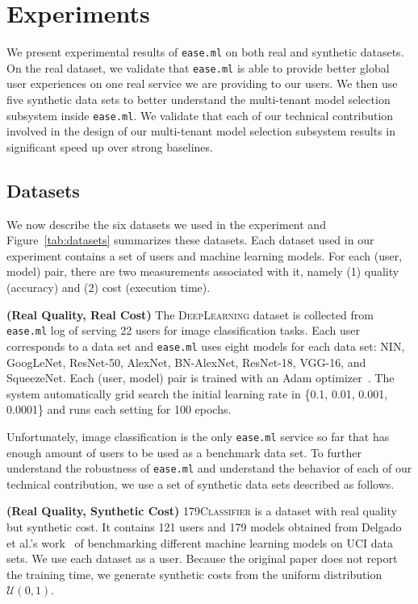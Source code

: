 \documentclass[letterpaper]{vldb}
\newcommand{\eml}{\texttt{ease.ml}\xspace}
\begin{document}
\section{Experiments}\label{sec:experiments}

We present experimental results of 
\eml on both real and synthetic datasets.
On the real dataset, we validate that
\eml is able to provide
better global user experiences on one
real service we are providing to our users. 
We then use five synthetic data sets
to better understand the multi-tenant model
selection subsystem inside \eml. We validate
that each of our technical contribution 
involved in the design of our 
multi-tenant model selection subsystem
results in significant speed up
over strong baselines.

\subsection{Datasets}

We now describe the six datasets we used
in the experiment and Figure~\ref{tab:datasets} summarizes these datasets.
Each dataset used in our experiment 
contains a set of users and machine
learning models. For each (user, model)
pair, there are two measurements
associated with it, namely (1) quality
(accuracy) and (2) cost
(execution time).

\vspace{0.5em}
\noindent
{\bf (Real Quality, Real Cost)} The 
\textsc{DeepLearning} dataset is collected
from \eml log of serving 22 users 
for image classification tasks. Each
user corresponds to a data set and
\eml uses eight models for
each data set:
NIN, GoogLeNet, ResNet-50, AlexNet, BN-AlexNet, ResNet-18, VGG-16, and SqueezeNet.
Each (user, model) pair is trained with
an Adam optimizer~\cite{XX}. The
system automatically grid search 
the initial learning rate in
\{0.1, 0.01, 0.001, 0.0001\} and
runs each setting for 100 epochs.

\vspace{0.5em}
Unfortunately, image classification 
is the only \eml service so far that
has enough amount of users
to be used as a benchmark data set.
To further understand the robustness
of \eml and understand the
behavior of each of our technical
contribution, we use a set
of synthetic data sets described
as follows.

\vspace{0.5em}
\noindent
{\bf (Real Quality, Synthetic Cost)} 
\textsc{179Classifier}
is a dataset with real quality 
but synthetic cost. It contains
121 users and 179 models obtained from
Delgado et al.'s work~\cite{DelgadoCBA14}
of benchmarking different machine
learning models on UCI data sets.
We use each dataset as a user.
Because the original paper does not
report the training time, we 
generate synthetic costs from the uniform distribution $\mathcal{U}(0, 1)$.
\end{document}
